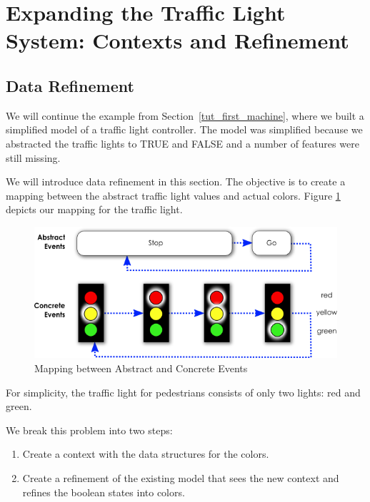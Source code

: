 \section{Expanding the Traffic Light System: Contexts and Refinement}
\label{tut_expanding_traffic_light_system}


\subsection{Data Refinement}
\label{tut_data_refinement}

We will continue the example from Section~\ref{tut_first_machine}, where we built a simplified model of a traffic light controller.  The model was simplified because we abstracted the traffic lights to TRUE and FALSE and a number of features were still missing.

We will introduce data refinement in this section.  The objective is to create a mapping between the abstract traffic light values and actual colors. Figure \ref{fig_tut_07_tl_colors} depicts our mapping for the traffic light.

\begin{figure}[!h]
\begin{center}
	\includegraphics{img/tutorial/tl-colors.png}
	\caption{Mapping between Abstract and Concrete Events}
	\label{fig_tut_07_tl_colors}
\end{center}
\end{figure}

For simplicity, the traffic light for pedestrians consists of only two lights: red and green.

We break this problem into two steps:

\begin{enumerate}
	\item Create a context with the data structures for the colors.
	\item Create a refinement of the existing model that sees the new context and refines the boolean states into colors.
\end{enumerate}

